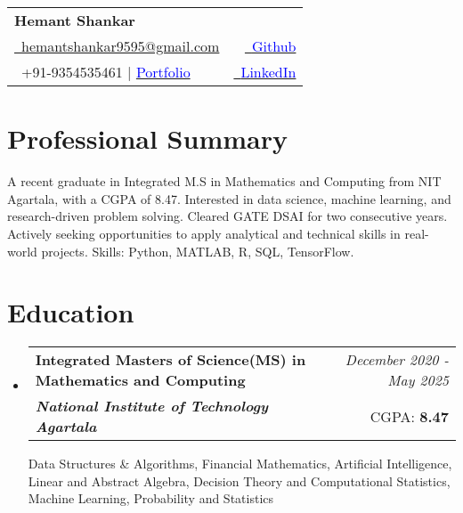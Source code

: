 \documentclass[a4paper,11pt]{article}
\makeatletter
\newcommand{\resumeSubheading}[4]{
\vspace{0.5mm}\item
    \begin{tabular*}{0.98\textwidth}[t]{l@{\extracolsep{\fill}}r}
        \textbf{#1} & \textit{\footnotesize{#4}} \\
        \textit{\footnotesize{#3}} &  \footnotesize{#2}\\
    \end{tabular*}
    \vspace{-2.4mm}
}
\newcommand{\resumeSubHeadingListStart}{\begin{itemize}[leftmargin=*,labelsep=0mm]}
\newcommand{\resumeSubHeadingListEnd}{\end{itemize}\vspace{2mm}}
\newcommand{\name}{Hemant Shankar} %
\newcommand{\phone}{9354535461 | \href{https://hemant-shankar-portfolio.onrender.com/}{\textcolor{blue}{Portfolio}}} %
\newcommand{\emaila}{hemantshankar9595@gmail.com} %
\makeatother
\begin{document}
\selectfont

{
\begin{tabularx}{\linewidth}{L r} \\
  \textbf{\Large \name}\\
  \href{mailto:hemantshankar9595@gmail.com}{\raisebox{0.0\height}{\footnotesize \faEnvelope}\ {\emaila}} & \href{https://github.com/HemantShankar}{\raisebox{0.0\height}{\footnotesize \faGithub}\ {\textcolor{blue}{Github}}} \\  
  {\raisebox{0.0\height}{\footnotesize \faPhone}\ +91-\phone} & \href{https://www.linkedin.com/in/hemant-shankar}{\raisebox{0.0\height}{\footnotesize \faLinkedin}\ {\textcolor{blue}{LinkedIn}}}
\end{tabularx}
}
\vspace{-4mm}
\section{\textbf{Professional Summary}}
\item A recent graduate in Integrated M.S in Mathematics and Computing from NIT Agartala, with a CGPA of 8.47. Interested in data science, machine learning, and research-driven problem solving. Cleared GATE DSAI for two consecutive years. Actively seeking opportunities to apply analytical and technical skills in real-world projects. Skills: Python, MATLAB, R, SQL, TensorFlow.
\section{\textbf{Education}}
  \resumeSubHeadingListStart
    \resumeSubheading
      { Integrated Masters of Science(MS) in Mathematics and Computing}{CGPA: \textbf{8.47}}
      {\textbf{National Institute of Technology Agartala}}{December 2020 - May 2025}
      \vspace{0.3cm}
      \small Data Structures \& Algorithms, Financial Mathematics, Artificial Intelligence, Linear and
Abstract Algebra, Decision Theory and
Computational Statistics, Machine Learning, 
Probability and Statistics
  \resumeSubHeadingListEnd
\vspace{-8.0mm}
%

\end{document}
